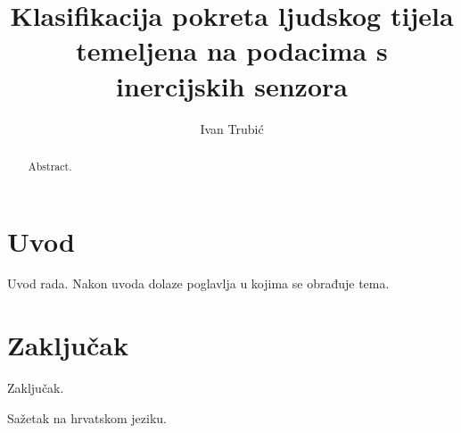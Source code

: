 \documentclass[times, utf8, diplomski]{fer}
\begin{document}

\title{Klasifikacija pokreta ljudskog tijela temeljena na podacima s inercijskih senzora}

\author{Ivan Trubić}

\maketitle

\izvornik

\zahvala{}

\tableofcontents

\chapter{Uvod}
Uvod rada. Nakon uvoda dolaze poglavlja u kojima se obrađuje tema.

\chapter{Zaključak}
Zaključak.




\begin{sazetak}
Sažetak na hrvatskom jeziku.

\end{sazetak}

\begin{abstract}
Abstract.

\end{abstract}
\end{document}
